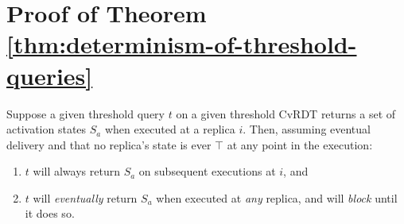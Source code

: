 \section{Proof of Theorem \ref{thm:determinism-of-threshold-queries}}\label{apdx:proofs}

\addtocounter{theorem}{-1}
\begin{theorem}
  Suppose a given threshold query $t$ on a given threshold CvRDT
  returns a set of activation states $S_a$ when executed at a replica
  $i$.  Then, assuming eventual delivery and that no replica's state
  is ever $\top$ at any point in the execution:
  \begin{enumerate}
  \item \label{thm:this-replica} 
  $t$ will always return $S_a$ on subsequent executions at $i$, and
  \item \label{thm:any-replica}
  $t$ will \emph{eventually} return $S_a$ when executed at \emph{any}
    replica, and will \emph{block} until it does so.
  \end{enumerate}
\end{theorem}
